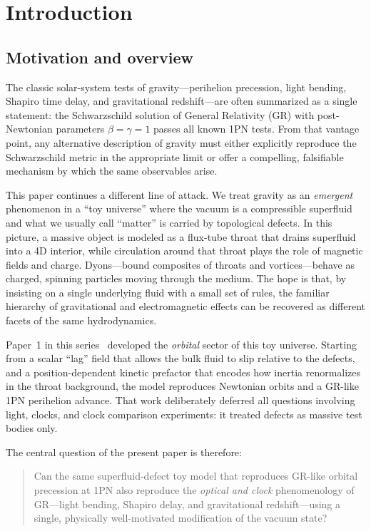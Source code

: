 \documentclass[11pt]{article}
\begin{document}
\section{Introduction}
\label{sec:intro}

\subsection{Motivation and overview}
\label{subsec:intro-motivation}

The classic solar-system tests of gravity---perihelion precession, light bending,
Shapiro time delay, and gravitational redshift---are often summarized as a single
statement: the Schwarzschild solution of General Relativity (GR) with post-Newtonian
parameters $\beta = \gamma = 1$ passes all known 1PN tests.
From that vantage point, any alternative description of gravity must either
explicitly reproduce the Schwarzschild metric in the appropriate limit or
offer a compelling, falsifiable mechanism by which the same observables arise.

This paper continues a different line of attack.
We treat gravity as an \emph{emergent} phenomenon in a ``toy universe'' where the
vacuum is a compressible superfluid and what we usually call ``matter'' is carried
by topological defects.
In this picture, a massive object is modeled as a flux-tube throat that drains
superfluid into a 4D interior, while circulation around that throat plays the role
of magnetic fields and charge.
Dyons---bound composites of throats and vortices---behave as charged, spinning
particles moving through the medium.
The hope is that, by insisting on a single underlying fluid with a small set of
rules, the familiar hierarchy of gravitational and electromagnetic effects can be
recovered as different facets of the same hydrodynamics.

Paper~1 in this series~\cite{Norris:2025Orbits} developed the \emph{orbital} sector
of this toy universe.
Starting from a scalar ``lag'' field that allows the bulk fluid to slip relative to
the defects, and a position-dependent kinetic prefactor that encodes how inertia
renormalizes in the throat background, the model reproduces Newtonian orbits and
a GR-like 1PN perihelion advance.
That work deliberately deferred all questions involving light, clocks, and
clock comparison experiments: it treated defects as massive test bodies only.

The central question of the present paper is therefore:

\begin{quote}
Can the same superfluid-defect toy model that reproduces GR-like orbital
precession at 1PN also reproduce the \emph{optical and clock} phenomenology
of GR---light bending, Shapiro delay, and gravitational redshift---using a
single, physically well-motivated modification of the vacuum state?
\end{quote}
\end{document}
